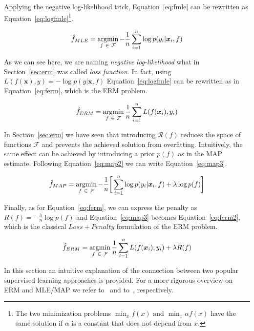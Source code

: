 Applying the negative log-likelihood trick, Equation~\eqref{eq:fmle} can be rewritten as Equation~\eqref{eq:logfmle}\footnote{ The two minimization problems $\min_x f(x)$ and $\min_x \alpha f(x)$ have the same solution if $\alpha$ is a constant that does not depend from $x$.}.

\begin{equation} \label{eq:logfmle}
	\hat f_{MLE} = \mathop{\mathrm{argmin}}\limits_{f~\in~\mathcal{F}} - \frac{1}{n} \sum_{i=1}^n \log p(y_i|\bm{x}_i,f)
\end{equation}

As we can see here, we are naming \textit{negative log-likelihood} what in Section~\ref{sec:erm} was called \textit{loss function}. In fact, using $L(f(\bm{x}), y) = -\log p(y|\bm{x}, f)$ Equation~\eqref{eq:logfmle} can be rewritten as in Equation~\eqref{eq:ferm}, which is the ERM problem.

\begin{equation} \label{eq:ferm}
	\hat f_{ERM} = \mathop{\mathrm{argmin}}\limits_{f~\in~\mathcal{F}} \frac{1}{n} \sum_{i=1}^n L(f(\bm{x}_i), y_i)
\end{equation}

In Section~\ref{sec:erm} we have seen that introducing $\mathcal{R}(f)$ reduces the space of functions $\mathcal{F}$ and prevents the achieved solution from overfitting. Intuitively, the same effect can be achieved by introducing a prior $p(f)$ as in the MAP estimate. Following Equation~\eqref{eq:map2} we can write Equation~\eqref{eq:map3}.

\begin{equation} \label{eq:map3}
	\hat f_{MAP} = \mathop{\mathrm{argmin}}\limits_{f~\in~\mathcal{F}} - \frac{1}{n} \bigg[ \sum_{i=1}^n \log p(y_i|\bm{x}_i,f) + \lambda \log p(f) \bigg]
\end{equation}

Finally, as for Equation~\eqref{eq:ferm}, we can express the penalty as $R(f) = - \frac{\lambda}{n} \log p(f)$ and Equation~\eqref{eq:map3} becomes Equation~\eqref{eq:ferm2}, which is the classical $Loss + Penalty$ formulation of the ERM problem.

\begin{equation} \label{eq:ferm2}
	\hat f_{ERM} = \mathop{\mathrm{argmin}}\limits_{f~\in~\mathcal{F}} \frac{1}{n} \sum_{i=1}^n L(f(\bm{x}_i), y_i) + \lambda R(f)
\end{equation}

In this section an intuitive explanation of the connection between two popular supervised learning approaches is provided. For a more rigorous overview on ERM and MLE/MAP we refer to~\cite{hastie2009elements} and to~\cite{rasmussen2006gaussian}, respectively.

